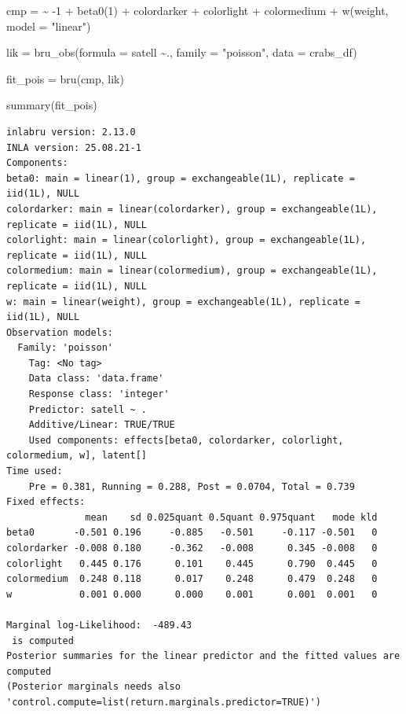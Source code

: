 \documentclass[
  letterpaper,
  DIV=11,
  numbers=noendperiod]{scrartcl}
\newenvironment{Shaded}{\begin{snugshade}}{\end{snugshade}}
\newcommand{\AttributeTok}[1]{\textcolor[rgb]{0.40,0.45,0.13}{#1}}
\newcommand{\DecValTok}[1]{\textcolor[rgb]{0.68,0.00,0.00}{#1}}
\newcommand{\ErrorTok}[1]{\textcolor[rgb]{0.68,0.00,0.00}{#1}}
\newcommand{\FunctionTok}[1]{\textcolor[rgb]{0.28,0.35,0.67}{#1}}
\newcommand{\NormalTok}[1]{\textcolor[rgb]{0.00,0.23,0.31}{#1}}
\newcommand{\OtherTok}[1]{\textcolor[rgb]{0.00,0.23,0.31}{#1}}
\newcommand{\SpecialCharTok}[1]{\textcolor[rgb]{0.37,0.37,0.37}{#1}}
\newcommand{\StringTok}[1]{\textcolor[rgb]{0.13,0.47,0.30}{#1}}
\begin{document}
\begin{Shaded}
\begin{Highlighting}[]
\NormalTok{cmp }\OtherTok{=}  \ErrorTok{\textasciitilde{}} \SpecialCharTok{{-}}\DecValTok{1} \SpecialCharTok{+} \FunctionTok{beta0}\NormalTok{(}\DecValTok{1}\NormalTok{) }\SpecialCharTok{+}\NormalTok{  colordarker }\SpecialCharTok{+}
\NormalTok{       colorlight }\SpecialCharTok{+}\NormalTok{ colormedium }\SpecialCharTok{+}
       \FunctionTok{w}\NormalTok{(weight, }\AttributeTok{model =} \StringTok{"linear"}\NormalTok{)}

\NormalTok{lik }\OtherTok{=}  \FunctionTok{bru\_obs}\NormalTok{(}\AttributeTok{formula =}\NormalTok{ satell }\SpecialCharTok{\textasciitilde{}}\NormalTok{.,}
            \AttributeTok{family =} \StringTok{"poisson"}\NormalTok{,}
            \AttributeTok{data =}\NormalTok{ crabs\_df)}

\NormalTok{fit\_pois }\OtherTok{=} \FunctionTok{bru}\NormalTok{(cmp, lik)}

\FunctionTok{summary}\NormalTok{(fit\_pois)}
\end{Highlighting}
\end{Shaded}

\begin{verbatim}
inlabru version: 2.13.0
INLA version: 25.08.21-1
Components:
beta0: main = linear(1), group = exchangeable(1L), replicate = iid(1L), NULL
colordarker: main = linear(colordarker), group = exchangeable(1L), replicate = iid(1L), NULL
colorlight: main = linear(colorlight), group = exchangeable(1L), replicate = iid(1L), NULL
colormedium: main = linear(colormedium), group = exchangeable(1L), replicate = iid(1L), NULL
w: main = linear(weight), group = exchangeable(1L), replicate = iid(1L), NULL
Observation models:
  Family: 'poisson'
    Tag: <No tag>
    Data class: 'data.frame'
    Response class: 'integer'
    Predictor: satell ~ .
    Additive/Linear: TRUE/TRUE
    Used components: effects[beta0, colordarker, colorlight, colormedium, w], latent[]
Time used:
    Pre = 0.381, Running = 0.288, Post = 0.0704, Total = 0.739 
Fixed effects:
              mean    sd 0.025quant 0.5quant 0.975quant   mode kld
beta0       -0.501 0.196     -0.885   -0.501     -0.117 -0.501   0
colordarker -0.008 0.180     -0.362   -0.008      0.345 -0.008   0
colorlight   0.445 0.176      0.101    0.445      0.790  0.445   0
colormedium  0.248 0.118      0.017    0.248      0.479  0.248   0
w            0.001 0.000      0.000    0.001      0.001  0.001   0

Marginal log-Likelihood:  -489.43 
 is computed 
Posterior summaries for the linear predictor and the fitted values are computed
(Posterior marginals needs also 'control.compute=list(return.marginals.predictor=TRUE)')
\end{verbatim}
\end{document}

